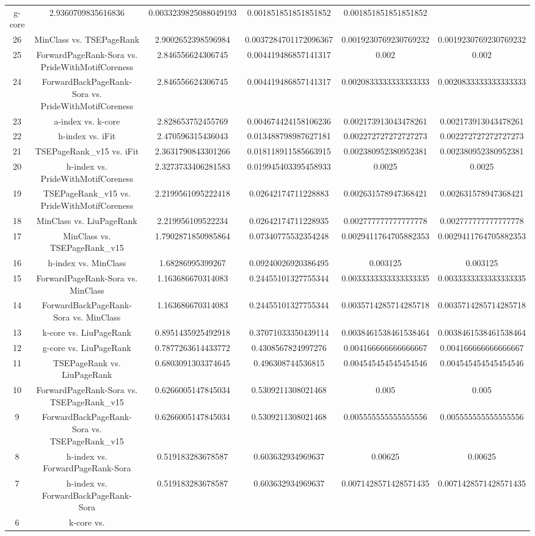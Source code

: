 \documentclass[a4paper,10pt]{article}
\begin{document}
\begin{landscape}
\begin{table}[!htp]
\begin{tabular}{cccccc}
g-core&2.9360709835616836&0.0033239825088049193&0.001851851851851852&0.001851851851851852\\26&MinClass vs. TSEPageRank&2.9002652398596984&0.0037284701172096367&0.0019230769230769232&0.0019230769230769232\\25&ForwardPageRank-Sora vs. PrideWithMotifCoreness&2.846556624306745&0.004419486857141317&0.002&0.002\\24&ForwardBackPageRank-Sora vs. PrideWithMotifCoreness&2.846556624306745&0.004419486857141317&0.0020833333333333333&0.0020833333333333333\\23&a-index vs. k-core&2.828653752455769&0.004674424158106236&0.002173913043478261&0.002173913043478261\\22&h-index vs. iFit&2.470596315436043&0.013488798987627181&0.002272727272727273&0.002272727272727273\\21&TSEPageRank_v15 vs. iFit&2.3631790843301266&0.018118911585663915&0.002380952380952381&0.002380952380952381\\20&h-index vs. PrideWithMotifCoreness&2.3273733406281583&0.019945403395458933&0.0025&0.0025\\19&TSEPageRank_v15 vs. PrideWithMotifCoreness&2.2199561095222418&0.02642174711228883&0.002631578947368421&0.002631578947368421\\18&MinClass vs. LiuPageRank&2.219956109522234&0.02642174711228935&0.002777777777777778&0.002777777777777778\\17&MinClass vs. TSEPageRank_v15&1.7902871850985864&0.07340775532354248&0.0029411764705882353&0.0029411764705882353\\16&h-index vs. MinClass&1.68286995399267&0.09240026920386495&0.003125&0.003125\\15&ForwardPageRank-Sora vs. MinClass&1.163686670314083&0.24455101327755344&0.0033333333333333335&0.0033333333333333335\\14&ForwardBackPageRank-Sora vs. MinClass&1.163686670314083&0.24455101327755344&0.0035714285714285718&0.0035714285714285718\\13&k-core vs. LiuPageRank&0.8951435925492918&0.37071033350439114&0.0038461538461538464&0.0038461538461538464\\12&g-core vs. LiuPageRank&0.7877263614433772&0.4308567824997276&0.004166666666666667&0.004166666666666667\\11&TSEPageRank vs. LiuPageRank&0.6803091303374645&0.496308744536815&0.004545454545454546&0.004545454545454546\\10&ForwardPageRank-Sora vs. TSEPageRank_v15&0.6266005147845034&0.5309211308021468&0.005&0.005\\9&ForwardBackPageRank-Sora vs. TSEPageRank_v15&0.6266005147845034&0.5309211308021468&0.005555555555555556&0.005555555555555556\\8&h-index vs. ForwardPageRank-Sora&0.519183283678587&0.603632934969637&0.00625&0.00625\\7&h-index vs. ForwardBackPageRank-Sora&0.519183283678587&0.603632934969637&0.0071428571428571435&0.0071428571428571435\\6&k-core vs. 
\end{tabular}
\end{table}
\end{landscape}
\end{document}
